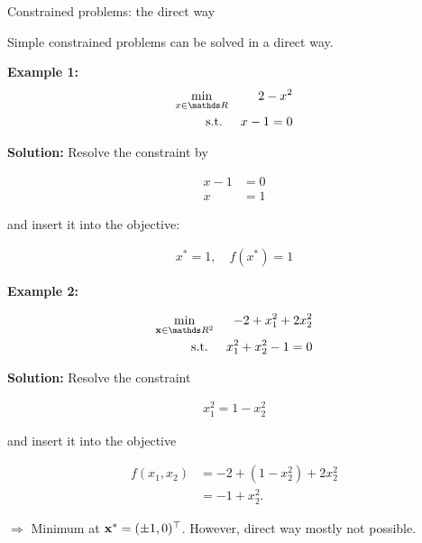 \documentclass[11pt,compress,t,notes=noshow, xcolor=table]{beamer}
\begin{document}
\begin{vbframe}{Constrained problems: the direct way}

Simple constrained problems can be solved in a direct way.

\medskip

\textbf{Example 1:}
\begin{eqnarray*}
    \min_{x\in \R} && 2 - x^2 \\
    \text{s.t. } && x - 1 = 0
\end{eqnarray*}

\textbf{Solution:} Resolve the constraint by

\vspace{-\baselineskip}

\begin{align*}
    x - 1 &= 0 \\
    x &= 1
\end{align*}

and insert it into the objective: 

\vspace*{-\baselineskip}

\begin{align*}
    x^\ast = 1, \quad f(x^\ast) = 1
\end{align*}

\framebreak

\textbf{Example 2:}

\vspace*{-\baselineskip}

\begin{eqnarray*}
    \min_{\xv \in \R^2} && - 2 + x_1^2 + 2 x_2^2\\
    \text{s.t. } && x_1^2 + x_2^2 - 1 = 0
\end{eqnarray*}

\textbf{Solution:} Resolve the constraint

\vspace{-\baselineskip}

\begin{eqnarray*}
    x_1^2 = 1 - x_2^2
\end{eqnarray*}

and insert it into the objective

\vspace*{-\baselineskip}

\begin{align*}
    f(x_1, x_2) &= -2 + (1 - x_2^2) + 2 x_2^2 \\
    &= -1 + x_2^2.
\end{align*}

$\Rightarrow$ Minimum at $\mathbf{x}^* = (\pm 1, 0)^\top$.
However, direct way mostly not possible.

\end{vbframe}
\end{document}
